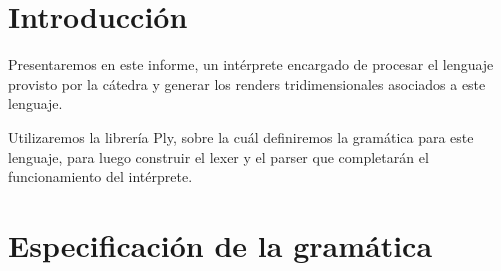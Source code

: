\documentclass[a4paper, 10pt, twoside]{article}
\begin{document}
\newpage




\section{Introducción}
Presentaremos en este informe, un intérprete encargado de procesar el lenguaje provisto por la cátedra y generar los renders tridimensionales asociados a este lenguaje.

Utilizaremos la librería Ply, sobre la cuál definiremos la gramática para este lenguaje, para luego construir el lexer y el parser que completarán el funcionamiento del intérprete.


\section{Especificación de la gramática}
\end{document}
